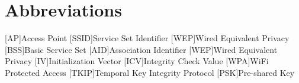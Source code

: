 \appendix
\renewcommand{\appendixtocname}{Appendix}
\renewcommand{\appendixpagename}{\appendixtocname}
\addappheadtotoc
{}
\appendixpage

\chapter{Abbreviations}

\begin{acronym}[\hspace{3cm}]
  [AP]{Access Point}
  [SSID]{Service Set Identifier}
  [WEP]{Wired Equivalent Privacy}
  [BSS]{Basic Service Set}
  [AID]{Association Identifier}
  [WEP]{Wired Equivalent Privacy}
  [IV]{Initialization Vector}
  [ICV]{Integrity Check Value}
  [WPA]{WiFi Protected Access}
  [TKIP]{Temporal Key Integrity Protocol}
  [PSK]{Pre-shared Key}
\end{acronym}

\clearpage
\listoffigures
{}
